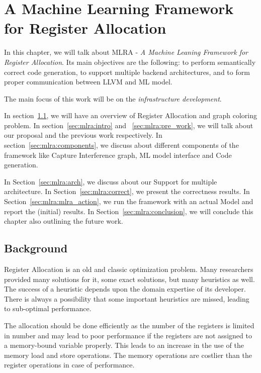 \chapter{A Machine Learning Framework for Register Allocation}
\label{chap:ch5}

In this chapter, we will talk about MLRA - \textit{A Machine Leaning Framework for Register Allocation}. Its main objectives are the following: to perform semantically correct code generation,  to support multiple backend architectures, 
and to form proper communication between LLVM and ML model. 

The main focus of this work will be on the \textit{infrastructure development}. 

In section~\ref{sec:mlra:bg}, we will have an overview of Register Allocation and graph coloring problem. In section~\ref{sec:mlra:intro} and ~\ref{sec:mlra:pre_work}, we will talk about our proposal and the previous work respectively. In section~\ref{sec:mlra:components}, we discuss about different components of the framework like Capture Interference graph, ML model interface and Code generation. 



In Section~\ref{sec:mlra:arch}, we discuss about our Support for multiple architecture. 
In Section~\ref{sec:mlra:correct}, we present the correctness results.
In Section~\ref{sec:mlra:mlra_action}, we run the framework with an actual Model and report the (initial) results. 
In Section~\ref{sec:mlra:conclusion}, we will conclude this chapter also outlining the future work.



\section{Background}\label{sec:mlra:bg}
Register Allocation is an old and classic optimization problem. Many researchers provided many solutions for it, some exact solutions, but many heuristics as well. The success of a heuristic  depends upon the domain expertise of its developer. There is always a possibility that some important heuristics are missed, leading to sub-optimal performance.

The allocation should be done efficiently as the number of the registers is limited in number and may lead to poor performance if the registers are not assigned to a memory-bound variable properly. This leads to an increase in the use of the memory load and store operations. The memory operations are costlier than the register operations in case of performance. 

